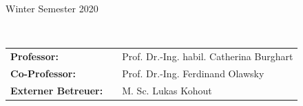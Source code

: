 \begin{titlepage}
\begin{center}
\begin{tabular}
\begin{center}
\large{Winter Semester 2020}
\end{center}

\\

\begin{center}
\begin{tabular}{lll}
\textbf{Professor:} & & Prof. Dr.-Ing. habil. Catherina Burghart\\
\textbf{Co-Professor:} & & Prof. Dr.-Ing. Ferdinand Olawsky\\
\textbf{Externer Betreuer:} & & M. Sc. Lukas Kohout\\
\end{tabular}
\end{center}
\end{tabular}
\end{center}
\end{titlepage}